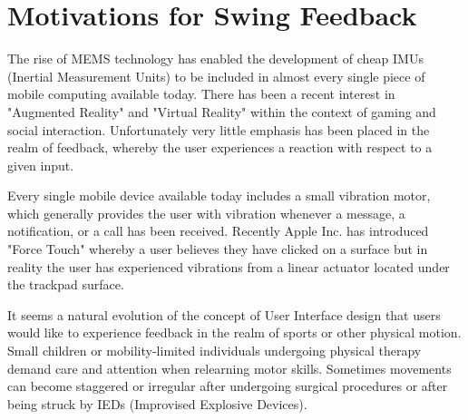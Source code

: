 
\section{Motivations for Swing Feedback}




The rise of MEMS technology has enabled the development of cheap IMUs (Inertial Measurement Units) to be included in almost every single piece of mobile computing available today.  There has been a recent interest in "Augmented Reality" and "Virtual Reality" within the context of gaming and social interaction.  Unfortunately very little emphasis has been placed in the realm of feedback, whereby the user experiences a reaction with respect to a given input.

Every single mobile device available today includes a small vibration motor, which generally provides the user with vibration whenever a message, a notification, or a call has been received.  Recently Apple Inc. has introduced "Force Touch" whereby a user believes they have clicked on a surface but in reality the user has experienced vibrations from a linear actuator located under the trackpad surface.

It seems a natural evolution of the concept of User Interface design that users would like to experience feedback in the realm of sports or other physical motion. Small children or mobility-limited individuals undergoing physical therapy demand care and attention when relearning motor skills.  Sometimes movements can become staggered or irregular after undergoing surgical procedures or after being struck by IEDs (Improvised Explosive Devices).

